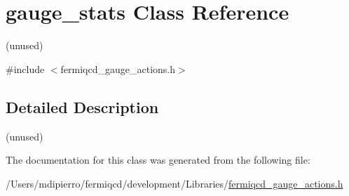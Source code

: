\hypertarget{classgauge__stats}{
\section{gauge\_\-stats Class Reference}
\label{classgauge__stats}
}


(unused)  


{\ttfamily \#include $<$fermiqcd\_\-gauge\_\-actions.h$>$}

\subsection{Detailed Description}
(unused) 

The documentation for this class was generated from the following file:\begin{DoxyCompactItemize}
\item 
/Users/mdipierro/fermiqcd/development/Libraries/\hyperlink{fermiqcd__gauge__actions_8h}{fermiqcd\_\-gauge\_\-actions.h}\end{DoxyCompactItemize}
